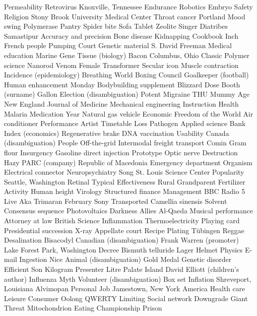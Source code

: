 Permeability  Retrovirus  Knoxville, Tennessee  
Endurance  Robotics  Embryo  
Safety  Religion  Stony Brook University Medical Center  
Throat cancer  Portland  Mood swing  
Polymerase  Pantry  Spider bite  
Sofa  Tablet  Zeolite  
Singer  Diatribes  Samastipur  
Accuracy and precision  Bone disease  Kidnapping  
Cookbook  Inch  French people  
Pumping  Court  Genetic material  
S. David Freeman  Medical education  Marine  
Gene  Tissue (biology)  Bacon  
Columbus, Ohio  Classic  Polymer science  
Nanorod  Venom  Female  
Transformer  Secular icon  Muscle contraction  
Incidence (epidemiology)  Breathing  World Boxing Council  
Goalkeeper (football)  Human enhancement  Monday  
Bodybuilding supplement  Blizzard  Dose  
Booth (surname)  Gallon  Election (disambiguation)  
Potent  Migraine  THU  
Mummy  Age  New England Journal of Medicine  
Mechanical engineering  Instruction  Health  
Malaria  Medication  Year  
Natural gas vehicle  Economic Freedom of the World  Air conditioner  
Performance  Artist  Timetable  
Loss  Pathogen  Applied science  
Bank  Index (economics)  Regenerative brake  
DNA vaccination  Usability  Canada (disambiguation)  
People  Off-the-grid  Intermodal freight transport  
Comin  Gram flour  Insurgency  
Gasoline direct injection  Prototype  Optic nerve  
Destruction  Hazy  PARC (company)  
Republic of Macedonia  Emergency department  Organism  
Electrical connector  Neuropsychiatry  Song  
St. Louis Science Center  Popularity  Seattle, Washington  
Retinal  Typical  Effectiveness  
Rural  Grandparent  Fertilizer  
Activity  Human height  Virology  
Structured finance  Management  BBC Radio 5 Live  
Aka  Trimaran  February  
Sony  Transported  Camellia sinensis  
Solvent  Consensus sequence  Photovoltaics  
Darkness  Allies  Al-Qaeda  
Musical performance  Attorney at law  British  
Science  Inflammation  Thermoelectricity  
Playing card  Presidential succession  X-ray  
Appellate court  Recipe  Plating  
Tübingen  Reggae  Desalination  
Bisacodyl  Canadian (disambiguation)  Frank Warren (promoter)  
Lake Forest Park, Washington  Decree  Bismuth telluride  
Lager  Helmet  Physics  
E-mail  Ingestion  Nice  
Animal (disambiguation)  Gold Medal  Genetic disorder  
Efficient  Son  Kilogram  
Presenter  Litre  Palate  
Island  David Elliott (children's author)  Influenza  
Myth  Volunteer (disambiguation)  Box set  
Inflation  Shreveport, Louisiana  Alvimopan  
Personal  Job  Jamestown, New York  
America  Health care  Leisure  
Consumer  Oolong  QWERTY  
Limiting  Social network  Downgrade  
Giant  Threat  Mitochondrion  
Eating  Championship  Prison  
